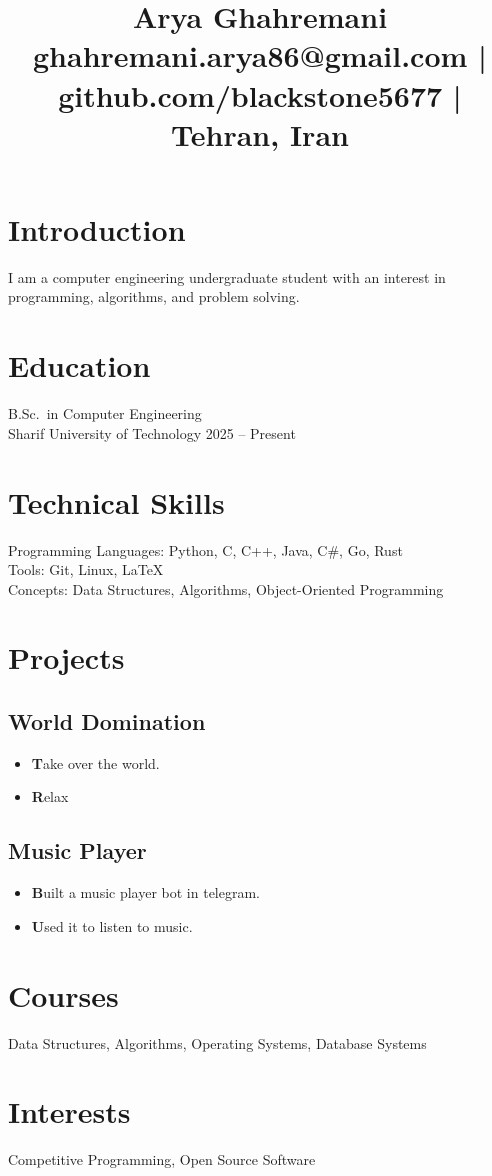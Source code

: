 \documentclass{article}
\title{
\centering
\textbf{Arya Ghahremani}\\
\vspace{0.3em}
\small
ghahremani.arya86@gmail.com \;|\;
github.com/blackstone5677 \;|\;
Tehran, Iran
}
\author{}
\date{}
\begin{document}
\maketitle
\thispagestyle{empty}

\section*{Introduction}
I am a computer engineering undergraduate student with an interest in programming,
algorithms, and problem solving.

\section*{Education}
B.Sc.\ in Computer Engineering \\
Sharif University of Technology \hfill 2025 -- Present

\section*{Technical Skills}
Programming Languages: Python, C, C++, Java, C\#, Go, Rust \\
Tools: Git, Linux, \LaTeX \\
Concepts: Data Structures, Algorithms, Object-Oriented Programming

\section*{Projects}
\subsection*{World Domination}
\begin{itemize}
    \item \textbf Take over the world.
    \item \textbf Relax
\end{itemize}

\subsection*{Music Player}
\begin{itemize}
    \item \textbf Built a music player bot in telegram.
    \item \textbf Used it to listen to music.
\end{itemize}

\section*{Courses}
Data Structures, Algorithms, Operating Systems, Database Systems

\section*{Interests}
Competitive Programming, Open Source Software
\end{document}
